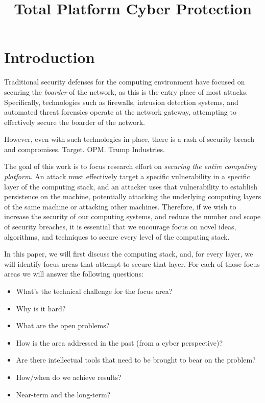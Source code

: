 \documentclass[11pt]{article}
\begin{document}
\title{Total Platform Cyber Protection}
\date{}

\maketitle

\section{Introduction}

Traditional security defenses for the computing environment have
focused on securing the \emph{boarder} of the network, as this is the
entry place of most attacks. Specifically, technologies such as
firewalls, intrusion detection systems, and automated threat forensics
operate at the network gateway, attempting to effectively secure the
boarder of the network.

However, even with such technologies in place, there is a rash of
security breach and compromises. Target. OPM. Trump Industries.

The goal of this work is to focus research effort on \emph{securing
  the entire computing platform.} An attack must effectively target a
specific vulnerability in a specific layer of the computing stack, and
an attacker uses that vulnerability to establish persistence on the
machine, potentially attacking the underlying computing layers of the
same machine or attacking other machines. Therefore, if we wish to
increase the security of our computing systems, and reduce the number
and scope of security breaches, it is essential that we encourage
focus on novel ideas, algorithms, and techniques to secure every level
of the computing stack.

In this paper, we will first discuss the computing stack, and, for
every layer, we will identify focus areas that attempt to secure that
layer. For each of those focus areas we will answer the following
questions:

\begin{itemize}
  \item What's the technical challenge for the focus area?
  \item Why is it hard?
  \item What are the open problems?
  \item How is the area addressed in the past (from a cyber perspective)?
  \item Are there intellectual tools that need to be brought to bear on the problem?
  \item How/when do we achieve results?
  \item Near-term and the long-term?
\end{itemize}
\end{document}
